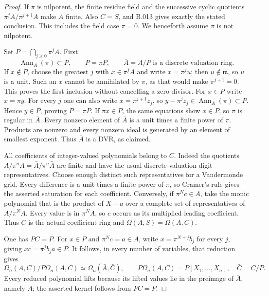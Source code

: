 \begin{proof}
If $\pi$ is nilpotent, the finite residue field and the successive cyclic
quotients $\pi^jA/\pi^{j+1}A$ make $A$ finite. Also $C=S$, and B.013
gives exactly the stated conclusion. This includes the field case
$\pi=0$. We henceforth assume $\pi$ is not nilpotent.

Set $P=\bigcap_{j\ge0}\pi^jA$. First
\[
          \operatorname{Ann}_A(\pi)\subset P,
          \qquad P=\pi P,\qquad \bar A=A/P
          \text{ is a discrete valuation ring}.           \tag{B71.2}
\]
If $x\notin P$, choose the greatest $j$ with $x\in\pi^jA$ and write
$x=\pi^ju$; then $u\notin\mathfrak m$, so $u$ is a unit.
Such an $x$ cannot be annihilated by $\pi$, as that would make
$\pi^{j+1}=0$. This proves the first inclusion without cancelling a
zero divisor. For $x\in P$ write $x=\pi y$. For every $j$ one can also
write $x=\pi^{j+1}z_j$, so
$y-\pi^jz_j\in\operatorname{Ann}_A(\pi)\subset P$.
Hence $y\in P$, proving $P=\pi P$.
If $\pi x\in P$, the same equations show $x\in P$, so $\pi$ is regular
in $\bar A$. Every nonzero element of $\bar A$ is a unit times a finite
power of $\pi$. Products are nonzero and every nonzero ideal is generated
by an element of smallest exponent. Thus $\bar A$ is a DVR, as claimed.

All coefficients of integer-valued polynomials belong to $C$.
Indeed the quotients $A/\pi^nA=\bar A/\pi^n\bar A$ are finite and have
the usual discrete-valuation digit representatives. Choose enough
distinct such representatives for a Vandermonde grid. Every difference
is a unit times a finite power of $\pi$, so Cramer's rule gives the
asserted saturation for each coefficient. Conversely, if $\pi^Nc\in A$,
take the monic polynomial that is the product of $X-a$ over a complete
set of representatives of $A/\pi^NA$. Every value is in $\pi^NA$, so
$c$ occurs as its multiplied leading coefficient. Thus $C$ is the actual
coefficient ring and $\Omega(A,S)=\Omega(A,C)$.

One has $PC=P$. For $x\in P$ and $\pi^Nc=a\in A$, write
$x=\pi^{N+j}b_j$ for every $j$, giving $xc=\pi^jb_ja\in P$.
It follows, in every number of variables, that reduction gives
\[
  \Omega_n(A,C)/P\Omega_n(A,C)
       \simeq\Omega_n(\bar A,\bar C),\qquad
  P\Omega_n(A,C)=P[X_1,\ldots,X_n],\quad \bar C=C/P.       \tag{B71.3}
\]
Every reduced polynomial lifts because its lifted values lie in the
preimage of $\bar A$, namely $A$; the asserted kernel follows from
$PC=P$.


\end{proof}
